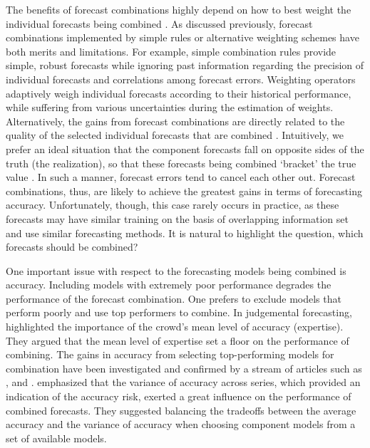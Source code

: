 \documentclass[11pt]{article}
\begin{document}
The benefits of forecast combinations highly depend on how to best weight the individual forecasts being combined \citep{Stock2004-rq,Timmermann2006-en}. As discussed previously, forecast combinations implemented by simple rules or alternative weighting schemes have both merits and limitations. For example, simple combination rules provide simple, robust forecasts while ignoring past information regarding the precision of individual forecasts and correlations among forecast errors. Weighting operators adaptively weigh individual forecasts according to their historical performance, while suffering from various uncertainties during the estimation of weights. Alternatively, the gains from forecast combinations are directly related to the quality of the selected individual forecasts that are combined \citep{Batchelor1995-ps,Geweke2011-xk}. Intuitively, we prefer an ideal situation that the component forecasts fall on opposite sides of the truth (the realization), so that these forecasts being combined `bracket' the true value \citep{Bates1969-yj,Larrick2006-sr}. In such a manner, forecast errors tend to cancel each other out. Forecast combinations, thus, are likely to achieve the greatest gains in terms of forecasting accuracy. Unfortunately, though, this case rarely occurs in practice, as these forecasts may have similar training on the basis of overlapping information set and use similar forecasting methods. It is natural to highlight the question, which forecasts should be combined?

One important issue with respect to the forecasting models being combined is accuracy. Including models with extremely poor performance degrades the performance of the forecast combination. One prefers to exclude models that perform poorly and use top performers to combine. In judgemental forecasting, \cite{Mannes2014-dl} highlighted the importance of the crowd's mean level of accuracy (expertise). They argued that the mean level of expertise set a floor on the performance of combining. The gains in accuracy from selecting top-performing models for combination have been investigated and confirmed by a stream of articles such as \cite{Budescu2015-tu}, and \cite{Kourentzes2019-na}. \cite{Lichtendahl2020-ut} emphasized that the variance of accuracy across series, which provided an indication of the accuracy risk, exerted a great influence on the performance of combined forecasts. They suggested balancing the tradeoffs between the average accuracy and the variance of accuracy when choosing component models from a set of available models.
\end{document}
